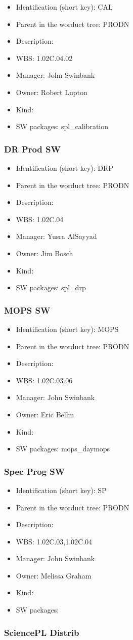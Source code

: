 \begin{itemize}\item Identification (short key): CAL
\item Parent in the worduct tree: PRODN
\item Description: 
\item WBS: 1.02C.04.02
\item Manager: John Swinbank
\item Owner: Robert Lupton
\item Kind:
\item SW packages: spl\_calibration
\end{itemize}\subsubsection{DR Prod SW}
\begin{itemize}\item Identification (short key): DRP
\item Parent in the worduct tree: PRODN
\item Description: 
\item WBS: 1.02C.04
\item Manager: Yusra AlSayyad
\item Owner: Jim Bosch
\item Kind:
\item SW packages: spl\_drp
\end{itemize}\subsubsection{MOPS SW}
\begin{itemize}\item Identification (short key): MOPS
\item Parent in the worduct tree: PRODN
\item Description: 
\item WBS: 1.02C.03.06
\item Manager: John Swinbank
\item Owner: Eric Bellm
\item Kind:
\item SW packages: mops\_daymops
\end{itemize}\subsubsection{Spec Prog SW}
\begin{itemize}\item Identification (short key): SP
\item Parent in the worduct tree: PRODN
\item Description: 
\item WBS: 1.02C.03,1.02C.04
\item Manager: John Swinbank
\item Owner: Melissa Graham
\item Kind:
\item SW packages: 
\end{itemize}\subsubsection{SciencePL Distrib}

